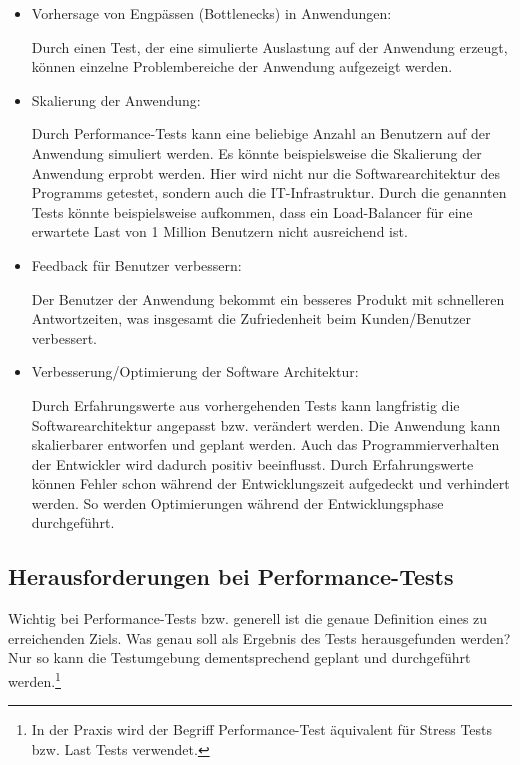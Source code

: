 \begin{itemize}
    \item Vorhersage von Engpässen (Bottlenecks) in Anwendungen:
   
    Durch einen Test, der eine simulierte Auslastung auf der Anwendung erzeugt, können einzelne Problembereiche der Anwendung aufgezeigt werden.
    
    \item Skalierung der Anwendung:

    Durch Performance-Tests kann eine beliebige Anzahl an Benutzern auf der Anwendung simuliert werden. Es könnte beispielsweise die Skalierung der Anwendung erprobt werden. Hier wird nicht nur die Softwarearchitektur des Programms getestet, sondern auch die IT-Infrastruktur. Durch die genannten Tests könnte beispielsweise aufkommen, dass ein Load-Balancer für eine erwartete Last von 1 Million Benutzern nicht ausreichend ist.
    
    \item Feedback für Benutzer verbessern:
    
    Der Benutzer der Anwendung bekommt ein besseres Produkt mit schnelleren Antwortzeiten, was insgesamt die Zufriedenheit beim Kunden/Benutzer verbessert.    
    
    \item Verbesserung/Optimierung der Software Architektur:
    
    Durch Erfahrungswerte aus vorhergehenden Tests kann langfristig die Softwarearchitektur angepasst bzw. verändert werden. Die Anwendung kann skalierbarer entworfen und geplant werden. Auch das Programmierverhalten der Entwickler wird dadurch positiv beeinflusst. Durch Erfahrungswerte können Fehler schon während der Entwicklungszeit aufgedeckt und verhindert werden. So werden Optimierungen während der Entwicklungsphase durchgeführt. 

\end{itemize}

\subsection{Herausforderungen bei Performance-Tests}

Wichtig bei Performance-Tests bzw. generell ist die genaue Definition eines zu erreichenden Ziels. 
Was genau soll als Ergebnis des Tests herausgefunden werden? Nur so kann die Testumgebung dementsprechend geplant und durchgeführt werden.\footnote{In der Praxis wird der Begriff \glqq Performance-Test\grqq{} äquivalent für Stress Tests bzw. Last Tests verwendet.\cite{Lasttest51:online}}

